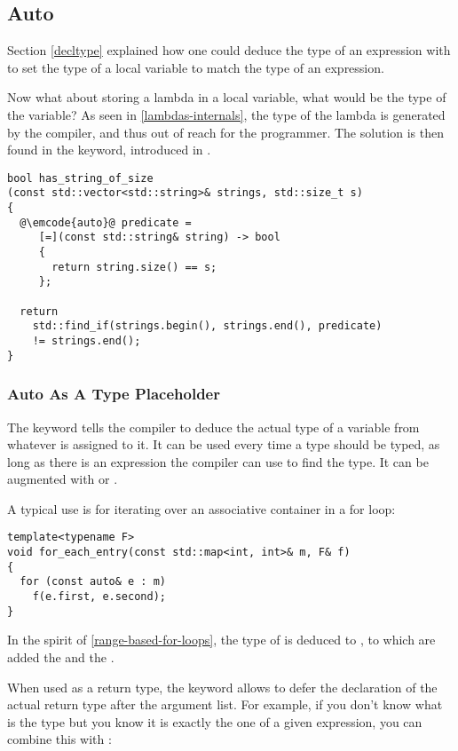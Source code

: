 \subsection{Auto}

Section \ref{decltype} explained how one could deduce the type of an
expression with  to set the type of a local variable
to match the type of an expression.

Now what about storing a lambda in a local variable, what would be the
type of the variable? As seen in \ref{lambdas-internals}, the type of
the lambda is generated by the compiler, and thus out of reach for the
programmer. The solution is then found in the  keyword,
introduced in .

\begin{lstlisting}
bool has_string_of_size
(const std::vector<std::string>& strings, std::size_t s)
{
  @\emcode{auto}@ predicate =
     [=](const std::string& string) -> bool
     {
       return string.size() == s;
     };

  return
    std::find_if(strings.begin(), strings.end(), predicate)
    != strings.end();
}
\end{lstlisting}

\subsubsection{Auto As A Type Placeholder}

The  keyword tells the compiler to deduce the actual type
of a variable from whatever is assigned to it. It can be used every
time a type should be typed, as long as there is an expression the
compiler can use to find the type. It can be augmented with
 or \code{\&}.

A typical use is for iterating over an associative container in a for
loop:

\begin{lstlisting}
template<typename F>
void for_each_entry(const std::map<int, int>& m, F& f)
{
  for (const auto& e : m)
    f(e.first, e.second);
}
\end{lstlisting}

In the spirit of \ref{range-based-for-loops}, the type of  is
deduced to , to which are added the 
and the \code{\&}.

When used as a return type, the  keyword allows to defer
the declaration of the actual return type after the argument list. For
example, if you don't know what is the type but you know it is exactly
the one of a given expression, you can combine this with
:

